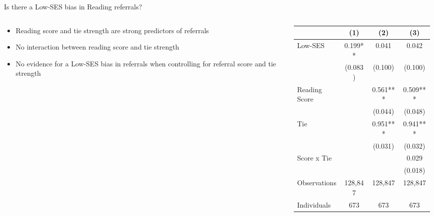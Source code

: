 \documentclass[aspectratio=169,xcolor=dvipsnames]{beamer}
\begin{document}
\begin{frame}{Is there a Low-SES bias in Reading referrals?}
    \begin{columns}[T]
        \begin{column}{0.38\textwidth}
            \vspace{2em}
            \begin{itemize}
                \item Reading score and tie strength are strong predictors of referrals
                \item No interaction between reading score and tie strength
                \item No evidence for a Low-SES bias in referrals when controlling for referral score and tie strength
            \end{itemize}
        \end{column}
        \begin{column}{0.62\textwidth}
            \begin{table}
                \centering
                \footnotesize
                \begin{threeparttable}
                \begin{tabular*}{0.9\columnwidth}{@{\extracolsep{\fill}}lccc}
                \toprule
                 & \multicolumn{1}{c}{(1)} & \multicolumn{1}{c}{(2)} & \multicolumn{1}{c}{(3)} \\
                \midrule
                Low-SES & 0.199** & 0.041 & 0.042 \\
                 & (0.083) & (0.100) & (0.100) \\
                Reading Score  &  & 0.561*** & 0.509*** \\
                 &  & (0.044) & (0.048) \\
                Tie &  & 0.951*** & 0.941*** \\
                 &  & (0.031) & (0.032) \\
                Score x Tie &  &  & 0.029 \\
                 &  &  & (0.018) \\
                \midrule
                Observations & 128,847 & 128,847 & 128,847 \\
                Individuals & 673 & 673 & 673 \\
                \bottomrule
                \end{tabular*}
                \label{tab:reading_regression}
                \end{threeparttable}
            \end{table}
        \end{column}
    \end{columns}
\end{frame}
\end{document}
